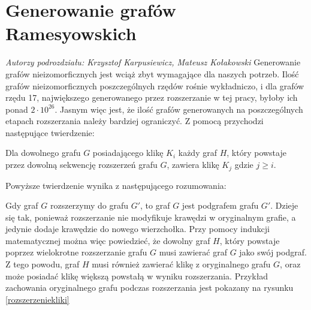 \section{Generowanie grafów Ramesyowskich}
\textit{Autorzy podrozdziału: Krzysztof Karpusiewicz, Mateusz Kołakowski}
\vspace{0.5cm}\newline
Generowanie grafów nieizomorficznych jest wciąż zbyt wymagające dla naszych potrzeb. Ilość grafów nieizomorficznych poszczególnych rzędów rośnie wykładniczo, i dla grafów rzędu 17, największego generowanego przez rozszerzanie w tej pracy, byłoby ich ponad $2 \cdot 10^{26}$\cite{OEIS}. Jasnym więc jest, że ilość grafów generowanych na poszczególnych etapach rozszerzania należy bardziej ograniczyć. Z pomocą przychodzi następujące twierdzenie: 


\begin{theorem}
	Dla dowolnego grafu $G$ posiadającego klikę $K_i$ każdy graf $H$, który powstaje przez dowolną sekwencję rozszerzeń grafu $G$, zawiera klikę $K_j$ gdzie $j \geq i$.
\label{tw5}
\end{theorem}


Powyższe twierdzenie wynika z  następującego rozumowania:

 Gdy graf $G$ rozszerzymy do grafu $G'$, to graf $G$ jest podgrafem grafu $G'$. Dzieje się tak, ponieważ rozszerzanie nie modyfikuje krawędzi w oryginalnym grafie, a jedynie dodaje krawędzie do nowego wierzchołka. Przy pomocy indukcji matematycznej można więc powiedzieć, że dowolny graf $H$, który powstaje poprzez wielokrotne rozszerzanie grafu $G$ musi zawierać graf $G$ jako swój podgraf. Z tego powodu, graf $H$ musi również zawierać klikę z oryginalnego grafu $G$, oraz może posiadać klikę większą powstałą w wyniku rozszerzania. Przykład zachowania oryginalnego grafu podczas rozszerzania jest pokazany na rysunku \ref{rozszerzeniekliki}


